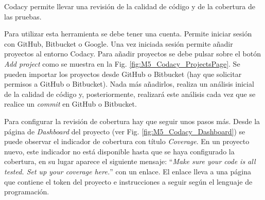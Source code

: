 Codacy permite llevar una revisión de la calidad de código y de la cobertura de las pruebas.

Para utilizar esta herramienta se debe tener una cuenta. Permite iniciar sesión con GitHub, Bitbucket o Google. Una vez iniciada sesión permite añadir proyectos al entorno Codacy. Para añadir proyectos se debe pulsar sobre el botón \textit{Add project} como se muestra en la Fig. \ref{fig:M5_Codacy_ProjectsPage}. Se pueden importar los proyectos desde GitHub o Bitbucket (hay que solicitar permisos a GitHub o Bitbucket). Nada más añadirlos, realiza un análisis inicial de la calidad de código y, posteriormente, realizará este análisis cada vez que se realice un \textit{commit} en GitHub o Bitbucket.


Para configurar la revisión de cobertura hay que seguir unos pasos más. Desde la página de \textit{Dashboard} del proyecto (ver Fig. \ref{fig:M5_Codacy_Dashboard}) se puede observar el indicador de cobertura con título \textit{Coverage}. En un proyecto nuevo, este indicador no está disponible hasta que se haya configurado la cobertura, en su lugar aparece el siguiente mensaje: ``\textit{Make sure your code is all tested. Set up your coverage here.}'' con un enlace. El enlace lleva a una página que contiene el token del proyecto e instrucciones a seguir según el lenguaje de programación.


